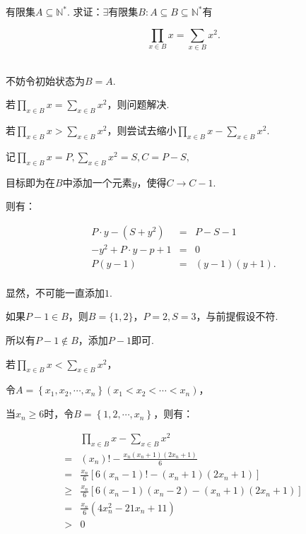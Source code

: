 \documentclass[8pt]{article}
\begin{document}
\begin{enumerate}
			有限集$A\subseteq \mathbb{N}^{*}$. 求证：$\exists$有限集$B: A\subseteq B \subseteq \mathbb{N}^{*}$有

			$$\prod_{x\in B}x=\sum_{x\in B}x^2.$$

			~\\
			不妨令初始状态为$B=A$.

			若$\displaystyle{\prod_{x\in B}x=\sum_{x\in B}x^2}$，则问题解决.

			若$\displaystyle{\prod_{x\in B}x>\sum_{x\in B}x^2}$，则尝试去缩小$\displaystyle{\prod_{x\in B}x-\sum_{x\in B}x^2}$.

			记$\displaystyle{\prod_{x\in B}x=P, \sum_{x\in B}x^2=S, C=P-S, }$

			目标即为在$B$中添加一个元素$y$，使得$C\rightarrow C-1$.

			则有：

			$$
			\begin{array}{rcl}
				P\cdot y - (S + y^2) &=& P - S - 1\\
				-y^2 + P\cdot y - p + 1 &=& 0\\
				P(y-1)&=&(y-1)(y+1).\\
			\end{array}
			$$

			显然，不可能一直添加$1$.

			如果$P-1\in B$，则$B=\{1,2\}$，$P=2, S=3$，与前提假设不符.

			所以有$P-1\notin B$，添加$P-1$即可.

			若$\displaystyle{\prod_{x\in B}x<\sum_{x\in B}x^2}$，

			令$A=\left\{x_1,x_2,\cdots,x_n\right\}\left(x_1<x_2<\cdots<x_n\right)$，

			当$x_n\geq 6时$，令$B=\left\{1,2,\cdots,x_n\right\}，则有：$

			$$
				\begin{array}{rl}
					&\displaystyle{\prod_{x\in B}x-\sum_{x\in B}x^2}\\
					=&\displaystyle{\left(x_n\right)!-\frac{x_n\left(x_n+1\right)\left(2x_n+1\right)}{6}}\\
					=&\frac{x_n}{6}\left[6\left(x_n-1\right)!-\left(x_n+1\right)\left(2x_n+1\right)\right]\\
					\geq&\frac{x_n}{6}\left[6\left(x_n-1\right)\left(x_n-2\right)-\left(x_n+1\right)\left(2x_n+1\right)\right]\\
					=&\frac{x_n}{6}\left(4x_n^2-21x_n+11\right)\\
					>&0\\
				\end{array}
			$$


\end{enumerate}
\end{document}

